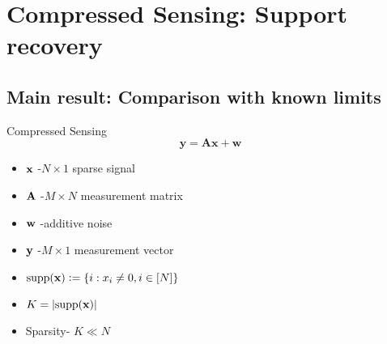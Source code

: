 \section{Compressed Sensing: Support recovery}
\subsection{Main result: Comparison with known limits}
\begin{frame}{Compressed Sensing}
\begin{equation*}
\mathbf{y=Ax +w}
\end{equation*}


\begin{itemize}
\item $\mathbf{x}$ -$N \times 1$ sparse signal
\item $\mathbf{A}$ -$M \times N$ measurement matrix
\item $\mathbf{w}$ -additive noise
\item $\mathbf{y}$ -$M \times 1$ measurement vector
\item $\text{supp}(\mathbf{x})\mathrel{\mathop:}= \{i: x_i\neq 0, i\in [N]\}$
\item $K=\lvert{\text{supp}(\mathbf{x})}\rvert$
\item Sparsity- $K\ll N$ 
\end{itemize}
\end{frame}

